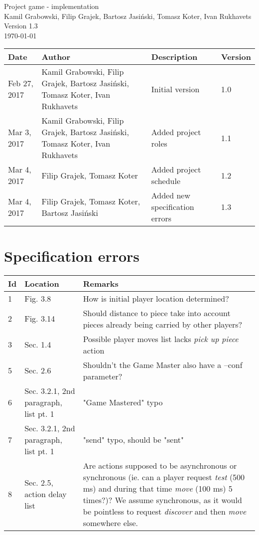 \documentclass[11pt,a4paper]{article}
\begin{document}
\begin{titlepage}
\centering
\huge Project game - implementation \\
\vspace{1.5cm}
\large Kamil Grabowski, Filip Grajek, Bartosz Jasiński, Tomasz Koter, Ivan Rukhavets \\
\vspace{1.0cm}
Version 1.3 \\
\vspace{1.0cm}
\today
\end{titlepage}

\begin{longtable}{| l | p{4.5cm} | p{4.5cm} | l | }
\hline
\textbf{Date} & \textbf{Author} & \textbf{Description} & \textbf{Version} \\ \hline
Feb 27, 2017 & Kamil Grabowski, Filip Grajek, Bartosz Jasiński, Tomasz Koter, Ivan Rukhavets & Initial version & 1.0 \\ \hline
Mar 3, 2017 & Kamil Grabowski, Filip Grajek, Bartosz Jasiński, Tomasz Koter, Ivan Rukhavets & Added project roles & 1.1 \\ \hline
Mar 4, 2017 & Filip Grajek, Tomasz Koter & Added project schedule & 1.2 \\ \hline
Mar 4, 2017 & Filip Grajek, Tomasz Koter, Bartosz Jasiński & Added new specification errors & 1.3 \\ \hline
\end{longtable}

\tableofcontents

\newpage

\section{Specification errors}
\begin{longtable}{|p{}|p{}|p{}|}
\hline
\textbf{Id}
& \textbf{Location}
& \textbf{Remarks}
\\ \hline
1
& Fig. 3.8
& How is initial player location determined?
\\ \hline
2
& Fig. 3.14
& Should distance to piece take into account pieces already being carried by other players?
\\ \hline
3
& Sec. 1.4
& Possible player moves list lacks \textit{pick up piece} action
\\ \hline
5
& Sec. 2.6
& Shouldn't the Game Master also have a --conf parameter?
\\ \hline
6
& Sec. 3.2.1, 2nd paragraph, list pt. 1
& "Game Mastered" typo
\\ \hline
7
& Sec. 3.2.1, 2nd paragraph, list pt. 1
& "send" typo, should be "sent"
\\ \hline
8
& Sec. 2.5, action delay list
& Are actions supposed to be asynchronous or synchronous (ie. can a player request \textit{test} (500 ms) and during that time \textit{move} (100 ms) 5 times?)? We assume synchronous, as it would be pointless to request \textit{discover} and then \textit{move} somewhere else.
\\ \hline
\end{longtable}
\end{document}
